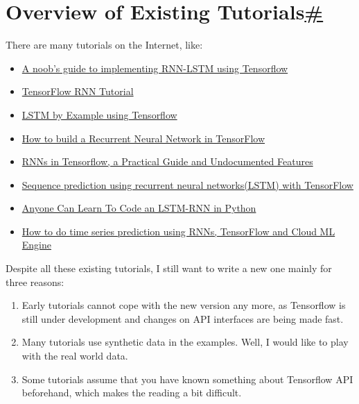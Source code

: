 \section{\texorpdfstring{Overview of Existing Tutorials\hyperref[overview-of-existing-tutorials]{\#}}{Overview of Existing Tutorials\#}}\label{overview-of-existing-tutorials}

There are many tutorials on the Internet, like:

\begin{itemize}
\tightlist
\item
  \href{http://monik.in/a-noobs-guide-to-implementing-rnn-lstm-using-tensorflow/}{A noob's guide to implementing RNN-LSTM using Tensorflow}
\item
  \href{https://svds.com/tensorflow-rnn-tutorial/}{TensorFlow RNN Tutorial}
\item
  \href{https://medium.com/towards-data-science/lstm-by-example-using-tensorflow-feb0c1968537}{LSTM by Example using Tensorflow}
\item
  \href{https://medium.com/@erikhallstrm/hello-world-rnn-83cd7105b767}{How to build a Recurrent Neural Network in TensorFlow}
\item
  \href{http://www.wildml.com/2016/08/rnns-in-tensorflow-a-practical-guide-and-undocumented-features/}{RNNs in Tensorflow, a Practical Guide and Undocumented Features}
\item
  \href{http://mourafiq.com/2016/05/15/predicting-sequences-using-rnn-in-tensorflow.html}{Sequence prediction using recurrent neural networks(LSTM) with TensorFlow}
\item
  \href{https://iamtrask.github.io/2015/11/15/anyone-can-code-lstm/}{Anyone Can Learn To Code an LSTM-RNN in Python}
\item
  \href{https://medium.com/google-cloud/how-to-do-time-series-prediction-using-rnns-and-tensorflow-and-cloud-ml-engine-2ad2eeb189e8}{How to do time series prediction using RNNs, TensorFlow and Cloud ML Engine}
\end{itemize}

Despite all these existing tutorials, I still want to write a new one mainly for three reasons:

\begin{enumerate}
\tightlist
\item
  Early tutorials cannot cope with the new version any more, as Tensorflow is still under development and changes on API interfaces are being made fast.
\item
  Many tutorials use synthetic data in the examples. Well, I would like to play with the real world data.
\item
  Some tutorials assume that you have known something about Tensorflow API beforehand, which makes the reading a bit difficult.
\end{enumerate}

